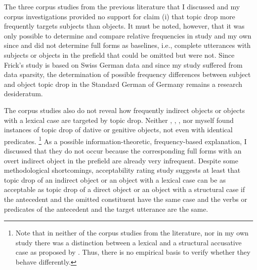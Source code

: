 The three corpus studies from the previous literature that I discussed and my corpus investigations provided no support for claim (i) that topic drop more frequently targets subjects than objects.
It must be noted, however, that it was only possible to determine and compare relative frequencies in  study and my own since \citet{poitou1993} and \citet{ruppenhofer2018} did not determine full forms as baselines, i.e., complete utterances with subjects or objects in the prefield that could be omitted but were not.
Since Frick's study is based on Swiss German data and since my study suffered from data sparsity, the determination of possible frequency differences between subject and object topic drop in the Standard German of Germany remains a research desideratum.

The corpus studies also do not reveal how frequently indirect objects or objects with a lexical case  are targeted by topic drop.
Neither \citet{poitou1993}, \citet{frick2017}, \citet{ruppenhofer2018}, nor myself found instances of topic drop of dative  or genitive  objects, not even with identical predicates.%
\footnote{Note that in neither of the corpus studies from the literature, nor in my own study there was a distinction between a lexical and a structural accusative case  as proposed by .
Thus, there is no empirical basis to verify whether they behave differently.}
%
As a possible information-theoretic, frequency-based explanation, I discussed that they do not occur because the corresponding full forms with an overt indirect object in the prefield are already very infrequent.
Despite some methodological shortcomings,  acceptability rating study suggests at least that topic drop of an indirect object or an object with a lexical case  can be as acceptable as topic drop of a direct object or an object with a structural case  if the antecedent and the omitted constituent have the same case and the verbs or predicates of the antecedent and the target utterance are the same. 

